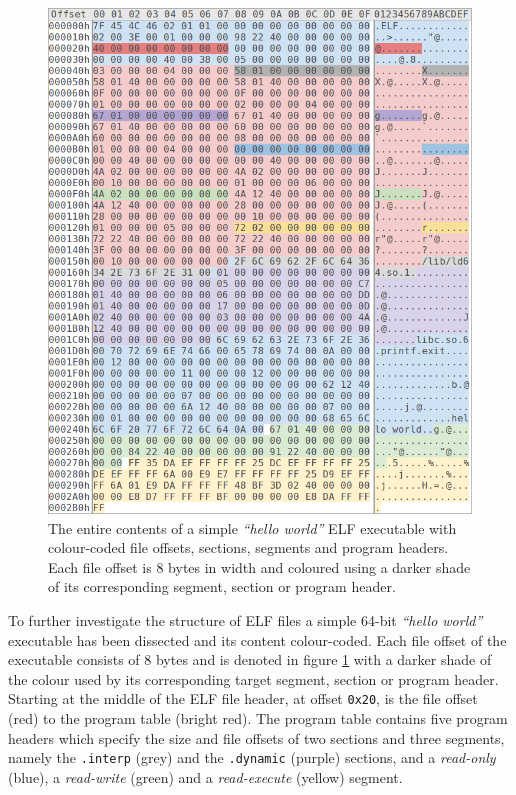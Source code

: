 \begin{figure}[htbp]
	\begin{center}
		\includegraphics[width=\textwidth]{inc/2_lit_review/elf_dissection.png}
		\caption{The entire contents of a simple \textit{``hello world''} ELF executable with colour-coded file offsets, sections, segments and program headers. Each file offset is 8 bytes in width and coloured using a darker shade of its corresponding segment, section or program header.}
		\label{fig:elf_dissection}
	\end{center}
\end{figure}

To further investigate the structure of ELF files a simple 64-bit \textit{``hello world''} executable has been dissected and its content colour-coded. Each file offset of the executable consists of 8 bytes and is denoted in figure \ref{fig:elf_dissection} with a darker shade of the colour used by its corresponding target segment, section or program header. Starting at the middle of the ELF file header, at offset \texttt{0x20}, is the file offset (red) to the program table (bright red). The program table contains five program headers which specify the size and file offsets of two sections and three segments, namely the \texttt{.interp} (grey) and the \texttt{.dynamic} (purple) sections, and a \textit{read-only} (blue), a \textit{read-write} (green) and a \textit{read-execute} (yellow) segment.

